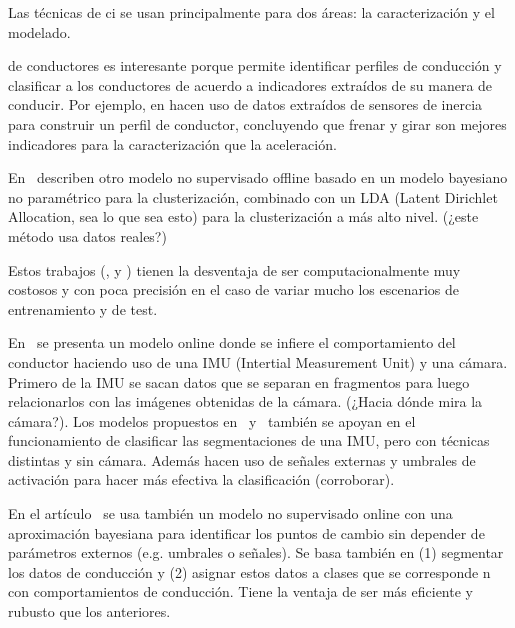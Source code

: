 Las técnicas de \gls{ci} se usan principalmente para dos áreas: la caracterización y el modelado.

 de conductores es interesante porque permite identificar perfiles de conducción y clasificar a los conductores de acuerdo a indicadores extraídos de su manera de conducir. Por ejemplo, en \cite{van2013driver} hacen uso de datos extraídos de sensores de inercia para construir un perfil de conductor, concluyendo que frenar y girar son mejores indicadores para la caracterización que la aceleración.

En~\cite{bando2013unsupervised} describen otro modelo no supervisado offline basado en un modelo bayesiano no paramétrico para la clusterización, combinado con un LDA (Latent Dirichlet Allocation, sea lo que sea esto) para la clusterización a más alto nivel. (\TODO ¿este método usa datos reales?)

Estos trabajos (\cite{sekizawa2007modeling}, \cite{terada2010multi} y \cite{bando2013unsupervised}) tienen la desventaja de ser computacionalmente muy costosos y con poca precisión en el caso de variar mucho los escenarios de entrenamiento y de test.

En~\cite{maye2011bayesian} se presenta un modelo online donde se infiere el comportamiento del conductor haciendo uso de una IMU (Intertial Measurement Unit) y una cámara. Primero de la IMU se sacan datos que se separan en fragmentos para luego relacionarlos con las imágenes obtenidas de la cámara. (\TODO ¿Hacia dónde mira la cámara?). Los modelos propuestos en~\cite{johnson2011driving} y~\cite{van2013driver} también se apoyan en el funcionamiento de clasificar las segmentaciones de una IMU, pero con técnicas distintas y sin cámara. Además hacen uso de señales externas y umbrales de activación para hacer más efectiva la clasificación (\TODO corroborar).

En el artículo~\cite{bender2015unsupervised} se usa también un modelo no supervisado online con una aproximación bayesiana para identificar los puntos de cambio sin depender de parámetros externos (e.g. umbrales o señales). Se basa también en (1) segmentar los datos de conducción y (2) asignar estos datos a clases que se corresponde n con comportamientos de conducción. Tiene la ventaja de ser más eficiente y rubusto que los anteriores.

